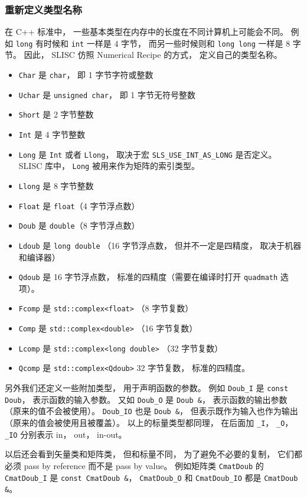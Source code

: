 \subsubsection{重新定义类型名称}
在 C++ 标准中， 一些基本类型在内存中的长度在不同计算机上可能会不同。 例如 \verb|long| 有时候和 \verb|int| 一样是 4 字节， 而另一些时候则和 \verb|long long| 一样是 8 字节。 因此， SLISC 仿照 Numerical Recipe \cite{NR3} 的方式， 定义自己的类型名称。
\begin{itemize}
\item \verb|Char| 是 \verb|char|， 即 1 字节字符或整数
\item \verb|Uchar| 是 \verb|unsigned char|， 即 1 字节无符号整数
\item \verb|Short| 是 2 字节整数
\item \verb|Int| 是 4 字节整数
\item \verb|Long| 是 \verb|Int| 或者 \verb|Llong|， 取决于宏 \verb|SLS_USE_INT_AS_LONG| 是否定义。 SLISC 库中， \verb|Long| 被用来作为矩阵的索引类型。
\item \verb|Llong| 是 8 字节整数
\item \verb|Float| 是 \verb|float|（4 字节浮点数）
\item \verb|Doub| 是 \verb|double|（8 字节浮点数）
\item \verb|Ldoub| 是 \verb|long double| （16 字节浮点数， 但并不一定是四精度， 取决于机器和编译器）
\item \verb|Qdoub| 是 16 字节浮点数， 标准的四精度（需要在编译时打开 \verb|quadmath| 选项）。
\item \verb|Fcomp| 是 \verb|std::complex<float>| （8 字节复数）
\item \verb|Comp| 是 \verb|std::complex<double>| （16 字节复数）
\item \verb|Lcomp| 是 \verb|std::complex<long double>| （32 字节复数）
\item \verb|Qcomp| 是 \verb|std::complex<Qdoub>| 32 字节复数， 标准的四精度。
\end{itemize}
另外我们还定义一些附加类型， 用于声明函数的参数。 例如 \verb|Doub_I| 是 \verb|const Doub|， 表示函数的输入参数。 又如 \verb|Doub_O| 是 \verb|Doub &|， 表示函数的输出参数（原来的值不会被使用）。 \verb|Doub_IO| 也是 \verb|Doub &|， 但表示既作为输入也作为输出（原来的值会被使用且被覆盖）。 以上的标量类型都同理， 在后面加 \verb|_I|， \verb|_O|， \verb|_IO| 分别表示 in， out， in-out。

以后还会看到矢量类和矩阵类， 但和标量不同， 为了避免不必要的复制， 它们都必须 pass by reference 而不是 pass by value。 例如矩阵类 \verb|CmatDoub| 的 \verb|CmatDoub_I| 是 \verb|const CmatDoub &|， \verb|CmatDoub_O| 和 \verb|CmatDoub_IO| 都是 \verb|CmatDoub &|。
